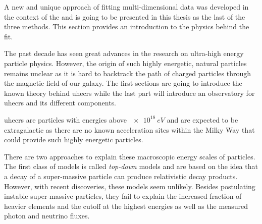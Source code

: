
\label{ssec:app}

A new and unique approach of fitting multi-dimensional data was developed in the context of the \pao{} and is going to be presented in this thesis as the last of the three methods. This section provides an introduction to the physics behind the fit.

The past decade has seen great advances in the research on ultra-high energy particle physics. However, the origin of such highly energetic, natural particles remains unclear as it is hard to backtrack the path of charged particles through the magnetic field of our galaxy. The first sections are going to introduce the known theory behind \glspl{uhecr} while the last part will introduce an observatory for \glspl{uhecr} and its different components.


\glspl{uhecr} are particles with energies above \(\SI{e18}{eV}\) and are expected to be extragalactic as there are no known acceleration sites within the Milky Way that could provide such highly energetic particles.~\cite{lastminute}

There are two approaches to explain these macroscopic energy scales of particles. The first class of models is called \emph{top-down} models and are based on the idea that a decay of a super-massive particle can produce relativistic decay products. However, with recent discoveries, these models seem unlikely. Besides postulating instable super-massive particles, they fail to explain the increased fraction of heavier elements and the cutoff at the highest energies as well as the measured photon and neutrino fluxes.~\cite{Letessier-Selvon2011}

